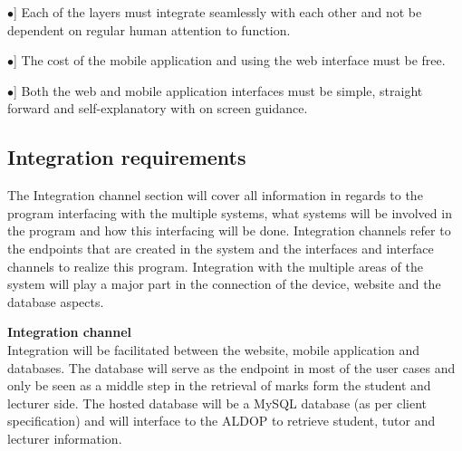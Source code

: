 \documentclass[12pt, a4paper]{scrartcl}
\newcommand{\tab}[1]{\hspace{.05\textwidth}\rlap{#1}}
\begin{document}
				\begin{description}
					\item \tab \textsc{\bf Integrability}
					\begin{description}
						\item \tab [$\bullet$] Each of the layers must integrate seamlessly with each other and not be dependent on regular human attention to function.
					\end{description}
				\end{description}
				\begin{description}
					\item \tab \textsc{\bf Cost}
					\begin{description}
						\item \tab [$\bullet$] The cost of the mobile application and using the web interface must be free.
					\end{description}
				\end{description}
				\begin{description}
					\item \tab \textsc{\bf Usability}
					\begin{description}
						\item \tab [$\bullet$] Both the web and mobile application interfaces must be simple, straight forward and self-explanatory with on screen guidance.
					\end{description}
				\end{description}
			\subsection{Integration requirements}
			The Integration channel section will cover all information in regards to the program interfacing with the multiple systems, what systems will be involved in the program and how this interfacing will be done. Integration channels refer to the endpoints that are created in the system and the interfaces and interface channels to realize this program. Integration with the multiple areas of the system will play a major part in the connection of the device, website and the database aspects.

			\textbf{Integration channel}\\
			Integration will be facilitated between the website, mobile application and databases. The database will serve as the endpoint in most of the user cases and only be seen as a middle step in the retrieval of marks form the student and lecturer side. The hosted database will be a MySQL database (as per client specification) and will interface to the ALDOP to retrieve student, tutor and lecturer information. 
\end{document}
